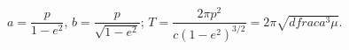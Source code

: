 $a=\dfrac{p}{1-e^2}$, $b=\dfrac{p}{\sqrt{1-e^2}}$; $T=\dfrac{2\pi p^2}{c(1-e^2)^{3/2}}=2\pi \sqrt{dfrac{a^3}{\mu}}$.
